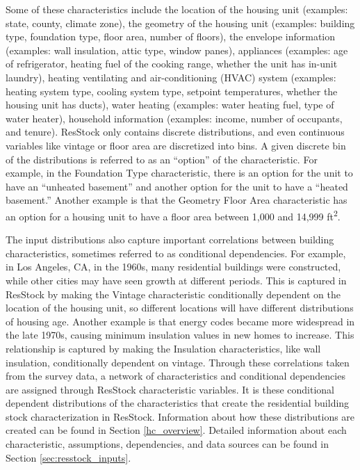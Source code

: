 
Some of these characteristics include the location of the housing unit (examples: state, county, climate zone), the geometry of the housing unit (examples: building type, foundation type, floor area, number of floors), the envelope information (examples: wall insulation, attic type, window panes), appliances (examples: age of refrigerator, heating fuel of the cooking range, whether the unit has in-unit laundry), heating ventilating and air-conditioning (HVAC) system (examples: heating system type, cooling system type, setpoint temperatures, whether the housing unit has ducts), water heating (examples: water heating fuel, type of water heater), household information (examples: income, number of occupants, and tenure). ResStock only contains discrete distributions, and even continuous variables like vintage or floor area are discretized into bins. A given discrete bin of the distributions is referred to as an ``option'' of the characteristic. For example, in the Foundation Type characteristic, there is an option for the unit to have an ``unheated basement'' and another option for the unit to have a ``heated basement.'' Another example is that the Geometry Floor Area characteristic has an option for a housing unit to have a floor area between 1,000 and 14,999 ft\textsuperscript{2}.


The input distributions also capture important correlations between building characteristics, sometimes referred to as conditional dependencies. For example, in Los Angeles, CA, in the 1960s, many residential buildings were constructed, while other cities may have seen growth at different periods. This is captured in ResStock by making the Vintage characteristic conditionally dependent on the location of the housing unit, so different locations will have different distributions of housing age. Another example is that energy codes became more widespread in the late 1970s, causing minimum insulation values in new homes to increase. This relationship is captured by making the Insulation characteristics, like wall insulation, conditionally dependent on vintage. Through these correlations taken from the survey data, a network of characteristics and conditional dependencies are assigned through ResStock characteristic variables. It is these conditional dependent distributions of the characteristics that create the residential building stock characterization in ResStock. Information about how these distributions are created can be found in Section \ref{hc_overview}. Detailed information about each characteristic, assumptions, dependencies, and data sources can be found in Section \ref{sec:resstock_inputs}.

